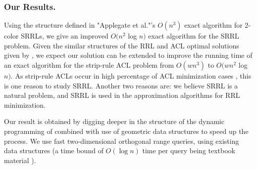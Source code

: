 \subsubsection{Our Results.}
Using the structure defined in "Applegate et al."'s \cite{ACJKLW07}
$O(n^3)$ exact algorithm for 2-color SRRLs,
we give an improved $O(n^2 $ log $n)$ exact algorithm for the SRRL problem.
Given the similar structures of the RRL and ACL optimal solutions given by
\cite{ACJKLW07}, we expect our solution can be extended to improve the
running time of an exact algorithm
for the strip-rule ACL problem from $O(wn^3)$ to  $O(w n^2$ log $n)$.
As strip-rule ACLs occur in high percentage
of ACL minimization cases \cite{ACJKLW07}, this is one reason to study SRRL.
Another two reasons are: we believe SRRL is a natural problem, and  SRRL is used in the approximation algorithms for RRL minimization.

Our result is obtained by digging deeper in the structure of the
dynamic programming of \cite{ACJKLW07} combined with use of
geometric data structures to speed up the process.
We use fast two-dimensional orthogonal range queries,
using existing data structures  (a time bound of $O(\log n)$ time
 per query being textbook material \cite{KOS2000}).

